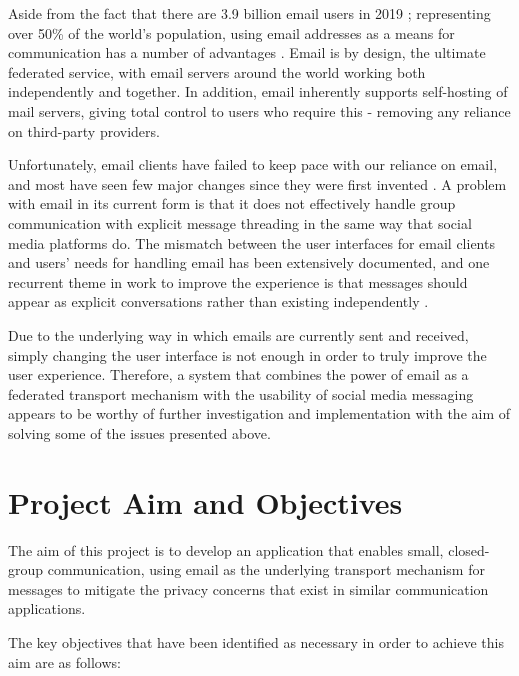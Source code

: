 Aside from the fact that there are 3.9 billion email users in 2019 \cite{radicati2019}; representing over 50\% of the world's population, using email addresses as a means for communication has a number of advantages \cite{hanson2011}. Email is by design, the ultimate federated service, with email servers around the world working both independently and together. In addition, email inherently supports self-hosting of mail servers, giving total control to users who require this - removing any reliance on third-party providers.

Unfortunately, email clients have failed to keep pace with our reliance on email, and most have seen few major changes since they were first invented \cite{rohall2004}. A problem with email in its current form is that it does not effectively handle group communication with explicit message threading in the same way that social media platforms do. The mismatch between the user interfaces for email clients and users' needs for handling email has been extensively documented, and one recurrent theme in work to improve the experience is that messages should appear as explicit conversations rather than existing independently \cite{venolia2003}.

Due to the underlying way in which emails are currently sent and received, simply changing the user interface is not enough in order to truly improve the user experience. Therefore, a system that combines the power of email as a federated transport mechanism with the usability of social media messaging appears to be worthy of further investigation and implementation with the aim of solving some of the issues presented above. 

\section{Project Aim and Objectives}

The aim of this project is to develop an application that enables small, closed-group communication, using email as the underlying transport mechanism for messages to mitigate the privacy concerns that exist in similar communication applications.

The key objectives that have been identified as necessary in order to achieve this aim are as follows:

